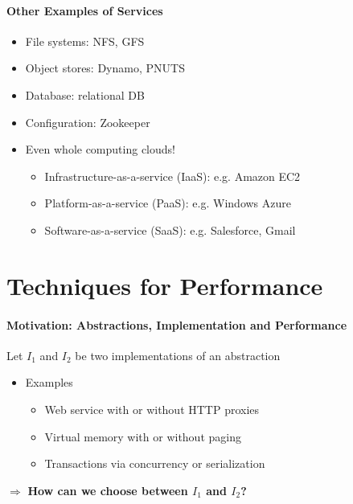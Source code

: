 \paragraph{Other Examples of Services}
\begin{itemize}
\item File systems: NFS, GFS
\item Object stores: Dynamo, PNUTS
\item Database: relational DB
\item Configuration: Zookeeper
\item Even whole computing clouds!
  \begin{itemize}
  \item Infrastructure-as-a-service (IaaS): e.g. Amazon EC2
  \item Platform-as-a-service (PaaS): e.g. Windows Azure
  \item Software-as-a-service (SaaS): e.g. Salesforce, Gmail
  \end{itemize}
\end{itemize}

\section{Techniques for Performance}

\paragraph{Motivation: Abstractions, Implementation and Performance}
Let $I_1$ and $I_2$ be two implementations of an abstraction

\begin{itemize}
\item Examples
  \begin{itemize}
  \item Web service with or without HTTP proxies
  \item Virtual memory with or without paging
  \item Transactions via concurrency or serialization
  \end{itemize}
\end{itemize}

$\Rightarrow$ \textbf{How can we choose between $I_1$ and $I_2$?}

